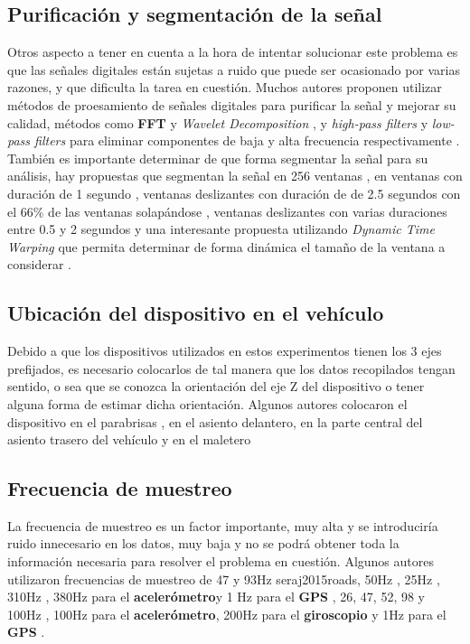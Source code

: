 	\subsection{Purificación y segmentación de la señal}
		Otros aspecto a tener en cuenta a la hora de intentar solucionar este problema es que las señales digitales están sujetas a ruido que puede ser
		ocasionado por varias razones, y que dificulta la tarea en cuestión. Muchos autores proponen utilizar métodos de proesamiento de señales digitales
		para purificar la señal y mejorar su calidad, métodos como \textbf{FFT} y \emph{Wavelet Decomposition} , y \emph{high-pass
		filters} y \emph{low-pass filters} para eliminar componentes de baja y alta frecuencia respectivamente . También es importante determinar de que forma segmentar la señal para su análisis, hay propuestas que segmentan la señal en 256
		ventanas , en ventanas con duración de 1 segundo , ventanas deslizantes con duración de 
		de 2.5 segundos con el 66\% de las ventanas solapándose , ventanas deslizantes con varias duraciones entre 0.5 y 2 segundos
		 y una interesante propuesta utilizando \emph{Dynamic Time Warping} que permita determinar de forma dinámica el
		tamaño de la ventana a considerar .

	\subsection{Ubicación del dispositivo en el vehículo}
		Debido a que los dispositivos utilizados en estos experimentos tienen los 3 ejes prefijados, es necesario colocarlos de tal manera que los
		datos recopilados tengan sentido, o sea que se conozca la orientación del eje Z del dispositivo o tener alguna forma de estimar dicha orientación.
		Algunos autores colocaron el dispositivo en el parabrisas , en el asiento delantero, en la parte
		central del asiento trasero del vehículo y en el maletero 
		
	\subsection{Frecuencia de muestreo}
		La frecuencia de muestreo es un factor importante, muy alta y se introduciría ruido innecesario en los datos, muy baja y no se podrá obtener
		toda la información necesaria para resolver el problema en cuestión. Algunos autores utilizaron frecuencias de muestreo de 47 y 93Hz \brackcite
		{seraj2015roads}, 50Hz , 25Hz , 310Hz , 380Hz para el 
		\textbf{acelerómetro}y 1 Hz para el \textbf{GPS} , 26, 47, 52, 98 y 100Hz , 100Hz para el 
		\textbf{acelerómetro}, 200Hz para el \textbf{giroscopio} y 1Hz para el \textbf{GPS} .

